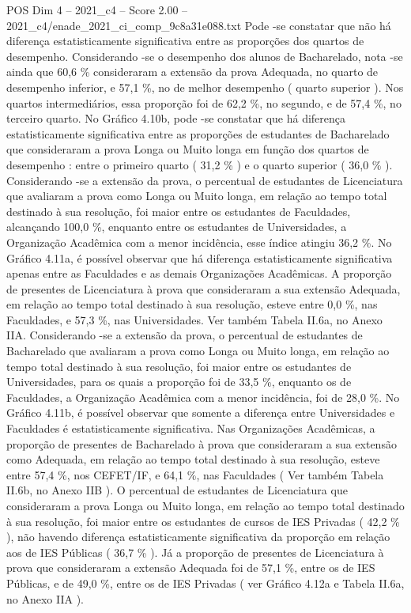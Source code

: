 \begin{textsample}{POS Dim 4 – 2021\_c4 – Score 2.00 – 2021\_c4/enade\_2021\_ci\_comp\_9c8a31e088.txt}
Pode -se constatar que não há diferença estatisticamente significativa entre as proporções dos quartos de desempenho.
Considerando -se o desempenho dos alunos de Bacharelado, nota -se ainda que 60,6 \% consideraram a extensão da prova Adequada, no quarto de desempenho inferior, e 57,1 \%, no de melhor desempenho ( quarto superior ).
Nos quartos intermediários, essa proporção foi de 62,2 \%, no segundo, e de 57,4 \%, no terceiro quarto.
No Gráfico 4.10b, pode -se constatar que há diferença estatisticamente significativa entre as proporções de estudantes de Bacharelado que consideraram a prova Longa ou Muito longa em função dos quartos de desempenho : entre o primeiro quarto ( 31,2 \% ) e o quarto superior ( 36,0 \% ).
Considerando -se a extensão da prova, o percentual de estudantes de Licenciatura que avaliaram a prova como Longa ou Muito longa, em relação ao tempo total destinado à sua resolução, foi maior entre os estudantes de Faculdades, alcançando 100,0 \%, enquanto entre os estudantes de Universidades, a Organização Acadêmica com a menor incidência, esse índice atingiu 36,2 \%.
No Gráfico 4.11a, é possível observar que há diferença estatisticamente significativa apenas entre as Faculdades e as demais Organizações Acadêmicas.
A proporção de presentes de Licenciatura à prova que consideraram a sua extensão Adequada, em relação ao tempo total destinado à sua resolução, esteve entre 0,0 \%, nas Faculdades, e 57,3 \%, nas Universidades.
Ver também Tabela II.6a, no Anexo IIA.
Considerando -se a extensão da prova, o percentual de estudantes de Bacharelado que avaliaram a prova como Longa ou Muito longa, em relação ao tempo total destinado à sua resolução, foi maior entre os estudantes de Universidades, para os quais a proporção foi de 33,5 \%, enquanto os de Faculdades, a Organização Acadêmica com a menor incidência, foi de 28,0 \%.
No Gráfico 4.11b, é possível observar que somente a diferença entre Universidades e Faculdades é estatisticamente significativa.
Nas Organizações Acadêmicas, a proporção de presentes de Bacharelado à prova que consideraram a sua extensão como Adequada, em relação ao tempo total destinado à sua resolução, esteve entre 57,4 \%, nos CEFET/IF, e 64,1 \%, nas Faculdades ( Ver também Tabela II.6b, no Anexo IIB ).
O percentual de estudantes de Licenciatura que consideraram a prova Longa ou Muito longa, em relação ao tempo total destinado à sua resolução, foi maior entre os estudantes de cursos de IES Privadas ( 42,2 \% ), não havendo diferença estatisticamente significativa da proporção em relação aos de IES Públicas ( 36,7 \% ).
Já a proporção de presentes de Licenciatura à prova que consideraram a extensão Adequada foi de 57,1 \%, entre os de IES Públicas, e de 49,0 \%, entre os de IES Privadas ( ver Gráfico 4.12a e Tabela II.6a, no Anexo IIA ).

\end{textsample}

